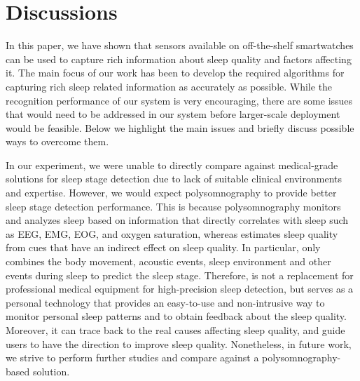 \section{Discussions}\label{sec:discussion}

In this paper, we have shown that sensors available on off-the-shelf smartwatches can be used to capture rich information about sleep quality and factors affecting it. The main focus of our work has been to develop the required algorithms for capturing rich sleep related information as accurately as possible. While the recognition performance of our system is very encouraging, there are some issues that would need to be addressed in our system before larger-scale deployment would be feasible. Below we highlight the main issues and briefly discuss possible ways to overcome them.


 {In our experiment, we were unable to directly compare {\systemname} against
medical-grade solutions for sleep stage detection due to lack of suitable clinical environments and expertise.} However, we would expect
polysomnography to provide better sleep stage detection performance. This is because polysomnography monitors and analyzes sleep based on
information that directly correlates with sleep such as EEG, EMG, EOG, and oxygen saturation, whereas {\systemname} estimates sleep quality
from cues that have an indirect effect on sleep quality. In particular, {\systemname} only combines the body movement, acoustic events,
sleep environment and other events during sleep to predict the sleep stage. Therefore, {\systemname} is not a replacement for professional
medical equipment for high-precision sleep detection, but serves as a personal technology that provides an easy-to-use and non-intrusive
way to monitor personal sleep patterns and to obtain feedback about the sleep quality. Moreover, it can trace back to the real causes
affecting sleep quality, and guide users to have the direction to improve sleep quality. Nonetheless, in future work, we strive to perform
further studies and compare {\systemname} against a polysomnography-based solution.

